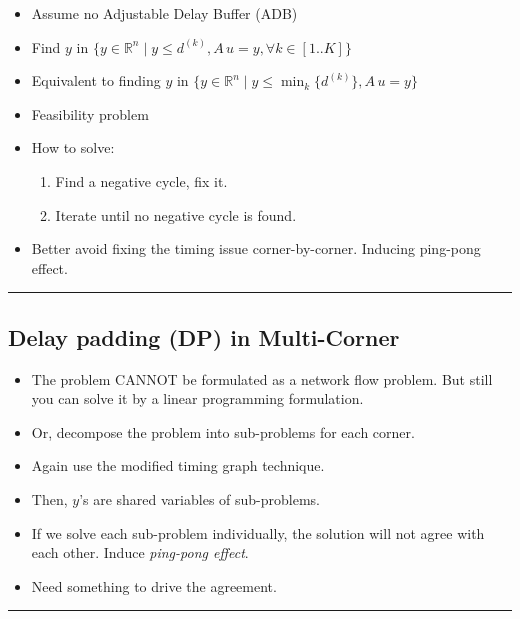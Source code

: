 \documentclass[
]{article}
\providecommand{\tightlist}{%
  \setlength{\itemsep}{0pt}\setlength{\parskip}{0pt}}
\begin{document}
\begin{itemize}
\tightlist
\item
  Assume no Adjustable Delay Buffer (ADB)
\item
  Find \(y\) in
  \(\{y \in \mathbb{R}^n \mid y \leq d^{(k)}, A\,u = y, \forall k\in[1..K]\}\)
\item
  Equivalent to finding \(y\) in
  \(\{y \in \mathbb{R}^n \mid y \leq \min_k\{ d^{(k)}\}, A\,u = y \}\)
\item
  Feasibility problem
\item
  How to solve:

  \begin{enumerate}
  \def\labelenumi{\arabic{enumi}.}
  \tightlist
  \item
    Find a negative cycle, fix it.
  \item
    Iterate until no negative cycle is found.
  \end{enumerate}
\item
  Better avoid fixing the timing issue corner-by-corner. Inducing
  ping-pong effect.
\end{itemize}

\begin{center}\rule{0.5\linewidth}{0.5pt}\end{center}

\subsection{Delay padding (DP) in Multi-Corner}\label{delay-padding-dp-in-multi-corner}

\begin{itemize}
\tightlist
\item
  The problem CANNOT be formulated as a network flow problem. But
  still you can solve it by a linear programming formulation.
\item
  Or, decompose the problem into sub-problems for each corner.
\item
  Again use the modified timing graph technique.
\item
  Then, \(y\)'s are shared variables of sub-problems.
\item
  If we solve each sub-problem individually, the solution will not
  agree with each other. Induce \emph{ping-pong effect}.
\item
  Need something to drive the agreement.
\end{itemize}

\begin{center}\rule{0.5\linewidth}{0.5pt}\end{center}
\end{document}
